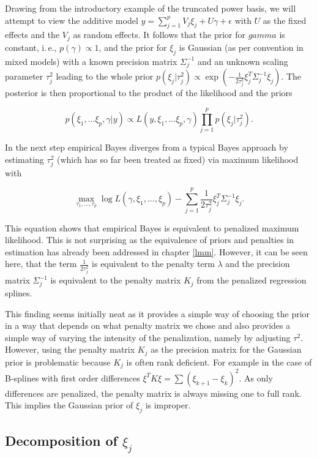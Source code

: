 \documentclass[12pt]{article}
\begin{document}
Drawing from the introductory example of the truncated power basis, we will attempt to view the additive model $y = \sum_{j=1}^p V_j \xi_j + U \gamma + \epsilon$ with $U$ as the fixed effects and the $V_j$ as random effects. It follows that the prior for $gamma$ is constant, i.\,e., $p(\gamma) \propto 1$, and the prior for $\xi_j$ is Gaussian (as per convention in mixed models) with a known precision matrix $\Sigma^{-1}_j$ and an unknown scaling parameter $\tau^2_j$ leading to the whole prior $p(\xi_j|\tau_j^2)  \propto \exp\left(-\frac{1}{2\tau^2_j} \xi_j^T\Sigma^{-1}_j \xi_j\right) $. The posterior is then proportional to the product of the likelihood and the priors

$$p(\xi_1, ... \xi_p, \gamma|y) \propto L(y,\xi_1, ... \xi_p, \gamma)\prod_{j=1}^p p(\xi_j|\tau_j^2). $$

In the next step empirical Bayes diverges from a typical Bayes approach by estimating $\tau^2_j$ (which has so far been treated as fixed) via maximum likelihood with

$$\max_{\tau_1, ..., \tau_p} \log L(\gamma, \xi_1,...,\xi_p) - \sum_{j=1}^p \frac{1}{2\tau^2_j} \xi_j^T \Sigma^{-1}_j \xi_j.$$

This equation shows that empirical Bayes is equivalent to penalized maximum likelihood. This is not surprising as the equivalence of priors and penalties in estimation has already been addressed in chapter \ref{lmm}. However, it can be seen here, that the term $\frac{1}{2\tau^2_j}$ is equivalent to the penalty term $\lambda$ and the precision matrix $\Sigma^{-1}_j$ is equivalent to the penalty matrix $K_j$ from the penalized regression splines. 

This finding seems initially neat as it provides a simple way of choosing the prior in a way that depends on what penalty matrix we chose and also provides a simple way of varying the intensity of the penalization, namely by adjusting $\tau^2$. However, using the penalty matrix $K_j$ as the precision matrix for the Gaussian prior is problematic because $K_j$ is often rank deficient. For example in the case of B-splines with first order differences $\xi^TK\xi = \sum(\xi_{k+1} - \xi_{k})^2$. As only differences are penalized, the penalty matrix is always missing one to full rank. This implies the Gaussian prior of $\xi_j$ is improper.

\subsection{Decomposition of $\xi_j$}
\end{document}
